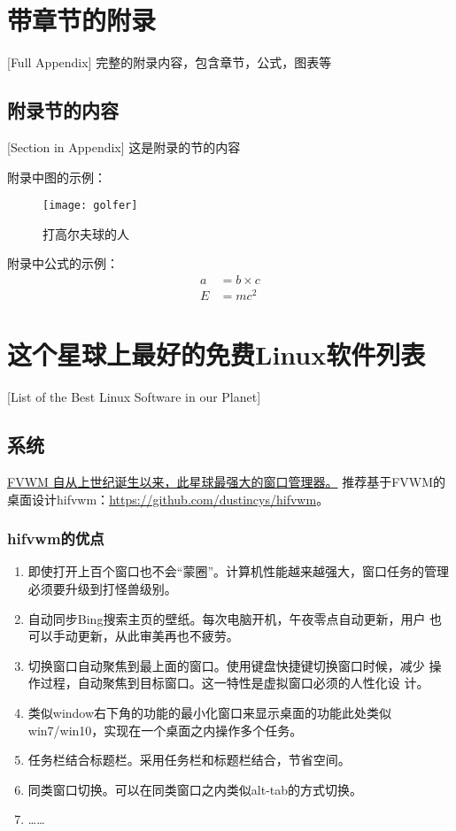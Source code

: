 \chapter{带章节的附录}[Full Appendix]%
完整的附录内容，包含章节，公式，图表等

\section{附录节的内容}[Section in Appendix]
这是附录的节的内容

附录中图的示例：
\begin{figure}[htbp]
\centering
\texttt{[image: golfer]}
\caption{\xiaosi[0]打高尔夫球的人}
\end{figure}

附录中公式的示例：
\begin{align}
a & = b \times c \\
E & = m c^2
\label{eq}
\end{align}

\chapter{这个星球上最好的免费Linux软件列表}[List of the Best Linux Software in our Planet]
\section{系统}

\href{http://fvwm.org/}{FVWM 自从上世纪诞生以来，此星球最强大的窗口管理器。}
推荐基于FVWM的桌面设计hifvwm：\href{https://github.com/dustincys/hifvwm}{https://github.com/dustincys/hifvwm}。

\subsection{hifvwm的优点}

\begin{enumerate}
	\item 即使打开上百个窗口也不会“蒙圈”。计算机性能越来越强大，窗口任务的管理必须要升级到打怪兽级别。
	\item 自动同步Bing搜索主页的壁纸。每次电脑开机，午夜零点自动更新，用户
		也可以手动更新，从此审美再也不疲劳。
	\item 切换窗口自动聚焦到最上面的窗口。使用键盘快捷键切换窗口时候，减少
		操作过程，自动聚焦到目标窗口。这一特性是虚拟窗口必须的人性化设
		计。
	\item 类似window右下角的功能的最小化窗口来显示桌面的功能此处类似
		win7/win10，实现在一个桌面之内操作多个任务。
	\item 任务栏结合标题栏。采用任务栏和标题栏结合，节省空间。
	\item 同类窗口切换。可以在同类窗口之内类似alt-tab的方式切换。
	\item ……
\end{enumerate}

